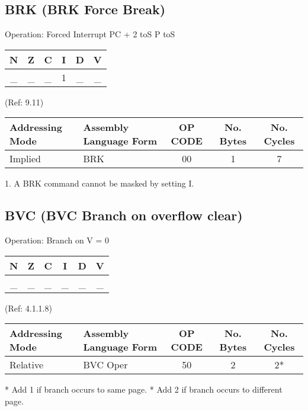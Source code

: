 \documentclass{article}
\begin{document}
  \subsection{BRK (BRK Force Break)}

  Operation:  Forced Interrupt PC + 2 toS P toS
  \begin{table}[H]
  \centering
  \begin{tabular}{|c c c c c c|}
  \hline
  N&Z&C&I&D&V\\
  \hline
  \_ & \_ & \_ & 1 & \_ & \_\\
  \hline
  \end{tabular}
  \end{table}
                                 (Ref: 9.11)
  \begin{table}[H]
  \centering
  \begin{tabular}{|l|l|c|c|c|}
  \hline
   Addressing Mode& Assembly Language Form& OP CODE &No. Bytes&No. Cycles\\
  \hline
    Implied       &   BRK                 &    00   &    1    &    7\\
  \hline
  \end{tabular}
  \end{table}
  1. A BRK command cannot be masked by setting I.


  \subsection{BVC (BVC Branch on overflow clear)}

  Operation:  Branch on V = 0
  \begin{table}[H]
  \centering
  \begin{tabular}{|c c c c c c|}
  \hline
  N&Z&C&I&D&V\\
  \hline
  \_ & \_ & \_ & \_ & \_ & \_\\
  \hline
  \end{tabular}
  \end{table}
                               (Ref: 4.1.1.8)
  \begin{table}[H]
  \centering
  \begin{tabular}{|l|l|c|c|c|}
  \hline
   Addressing Mode& Assembly Language Form& OP CODE &No. Bytes&No. Cycles\\
  \hline
    Relative      &   BVC Oper            &    50   &    2    &    2*\\
  \hline
  \end{tabular}
  \end{table}
  * Add 1 if branch occurs to same page.
  * Add 2 if branch occurs to different page.
\end{document}
